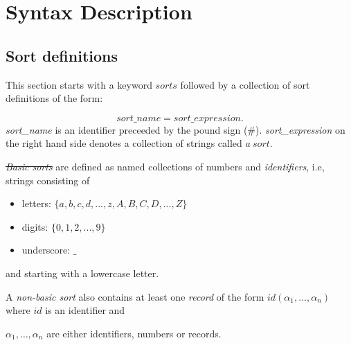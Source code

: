 \documentclass[12pt, letterpaper]{article}
\begin{document}
\section{Syntax Description}


\subsection{Sort definitions}\label{ss}


This section starts with a keyword $sorts$ followed by a collection of sort definitions of the form: 

\begin{equation*}
  sort\_name=sort\_expression.
\end{equation*}
\textit{sort\_name} is an identifier preceeded by the pound sign (\#).
\textit{sort\_expression}  on the right hand side denotes a collection of strings called $a~sort$.



\st \textit{Basic sorts} are defined as named collections of numbers and \textit{identifiers}, i.e, strings consisting of

\begin{itemize}

 \item letters: $\{a,b,c,d,...,z,A,B,C,D,...,Z\}$

 \item digits: $\{0,1,2,...,9\}$

 \item underscore: $\_$

\end{itemize}

and starting with a lowercase letter.


\medskip\noindent
A \textit{non-basic sort} also contains at least one \textit{record} of the form $id(\alpha_1,\dots, \alpha_n)$ where $id$ is an identifier and 

$\alpha_1, \dots, \alpha_n$ are either identifiers, numbers or records. 
\end{document}
